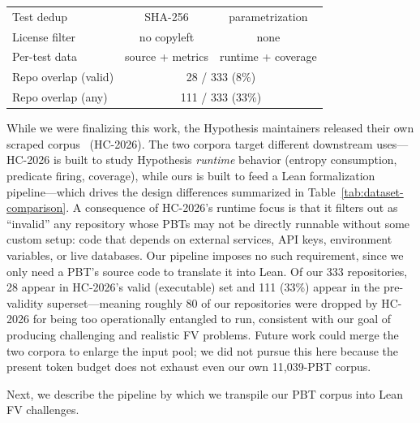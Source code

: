 \begin{table}[t]
\begin{minipage}[t]{0.62\textwidth}
\begin{tabular}{@{}l c c@{}}
    Test dedup       & SHA-256            & parametrization \\
    License filter   & no copyleft        & none \\
    Per-test data    & source + metrics   & runtime + coverage \\
    \midrule
    Repo overlap (valid)  & \multicolumn{2}{c}{28 / 333 \enskip(8\%)} \\
    Repo overlap (any)    & \multicolumn{2}{c}{111 / 333 \enskip(33\%)} \\
    \bottomrule
  \end{tabular}
\end{minipage}
\end{table}

While we were finalizing this work, the Hypothesis maintainers released their own scraped corpus~\cite{devoe2026hypothesis} (HC-2026).
The two corpora target different downstream uses---HC-2026 is built to study Hypothesis \emph{runtime} behavior (entropy consumption, predicate firing, coverage), while ours is built to feed a Lean formalization pipeline---which drives the design differences summarized in Table~\ref{tab:dataset-comparison}.
A consequence of HC-2026's runtime focus is that it filters out as ``invalid'' any repository whose PBTs may not be directly runnable without some custom setup: code that depends on external services, API keys, environment variables, or live databases. Our pipeline imposes no such requirement, since we only need a PBT's source code to translate it into Lean. Of our 333 repositories, 28 appear in HC-2026's valid (executable) set and 111 (33\%) appear in the pre-validity superset---meaning roughly 80 of our repositories were dropped by HC-2026 for being too operationally entangled to run, consistent with our goal of producing challenging and realistic FV problems.
Future work could merge the two corpora to enlarge the input pool; we did not pursue this here because the present token budget does not exhaust even our own 11{,}039-PBT corpus.

Next, we describe the pipeline by which we transpile our PBT corpus into Lean FV challenges.
